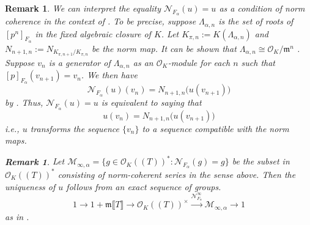 \documentclass[12pt]{article}
\newtheorem{remark}[theorem]{Remark}
\theoremstyle{definition}
\newcommand{\PS}[1]{\llbracket #1 \rrbracket}
\newcommand{\LS}[1]{(\!( #1 )\!)}
\def\CN{\mathscr{N}}
\def\m{\mathfrak{m}}
\def\O{\mathcal{O}}
\begin{document}
    \begin{remark}
        We can interpret the equality $\CN_{F_\alpha}(u) = u$ as a condition of norm coherence in the context of \cite{Col79}. To be precise, suppose $\Lambda_{\alpha,n}$ is the set of roots of $[p^n]_{F_\alpha}$ in the fixed algebraic closure of $K$. Let $K_{\pi,n} := K(\Lambda_{\alpha,n})$ and $N_{n+1,n} := N_{K_{\pi,n+1}/K_{\pi,n}}$ be the norm map. It can be shown that $\Lambda_{\alpha,n} \cong \O_K/\m^n$ \cite[I, 3.4]{Mil20}. Suppose $v_n$ is a generator of $\Lambda_{\alpha,n}$ as an $\O_K$-module for each $n$ such that $[p]_{F_\alpha}(v_{n+1}) = v_n$. We then have 
        \begin{equation*}
            \CN_{F_\alpha}(u)(v_n) = N_{n+1,n}\bigl(u(v_{n+1})\bigr)
        \end{equation*}
        by \cite[Corollary 12(ii)]{Col79}. Thus, $\CN_{F_\alpha}(u) = u$ is equivalent to saying that 
        \begin{equation*}
            u(v_n) = N_{n+1,n}\bigl(u(v_{n+1})\bigr)
        \end{equation*}
        i.e., $u$ transforms the sequence $\{v_n\}$ to a sequence compatible with the norm maps.  
        \begin{remark}
            Let $\mathscr{M}_{\infty,\alpha} = \{g \in \O_K\LS{T}^* \colon \CN_{F_\alpha}(g) = g\}$ be the subset in $\O_K\LS{T}^*$ consisting of norm-coherent series in the sense above. Then the uniqueness of $u$ follows from an exact sequence of groups. 
            \begin{equation*}
                1 \to 1 + \m\PS{T} \to \O_K\LS{T}^{\times} \stackrel{\CN_{F_\alpha}^\infty}{\longrightarrow} \mathscr{M}_{\infty,\alpha} \to 1
            \end{equation*}
            as in \cite[Proposition 14]{Col79}. 
        \end{remark}
    \end{remark}
\end{document}
